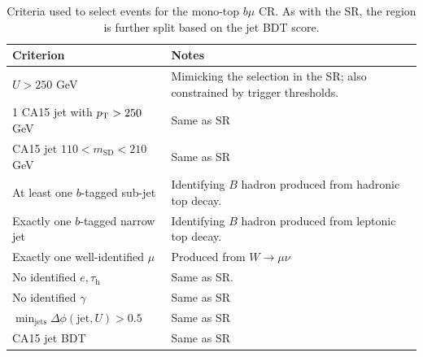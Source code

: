 \begin{table}[]
    \caption{Criteria used to select events for the mono-top $b\mu$ CR. As with the SR, the region is further split based on the jet BDT score.}
    \label{tab:mt:tmn_cuts}
    \centering
    \begin{tabular}{p{}p{}}
        Criterion & Notes \\ 
        \hline 
        \hline 
        $U>250$ GeV & Mimicking the selection in the SR; also constrained by trigger thresholds. \\ 
        1 CA15 jet with $p_\mathrm{T}>250$ GeV &  Same as SR \\ 
        CA15 jet $110 < m_\mathrm{SD} < 210$ GeV & Same as SR \\ 
        At least one $b$-tagged sub-jet & Identifying $B$ hadron produced from hadronic top decay. \\ 
        Exactly one $b$-tagged narrow jet & Identifying $B$ hadron produced from leptonic top decay. \\ 
        \hline 
        Exactly one well-identified $\mu$ & Produced from $W\rightarrow\mu\nu$ \\ 
        No identified $e,\tau_\mathrm{h}$ & Same as SR. \\ 
        No identified $\gamma$ & Same as SR \\ 
        \hline 
        $\min_\mathrm{jets}\Delta\phi(\mathrm{jet},U) > 0.5$ & Same as SR \\ 
        \hline 
        CA15 jet BDT & Same as SR\\ 
    \end{tabular}
\end{table}

